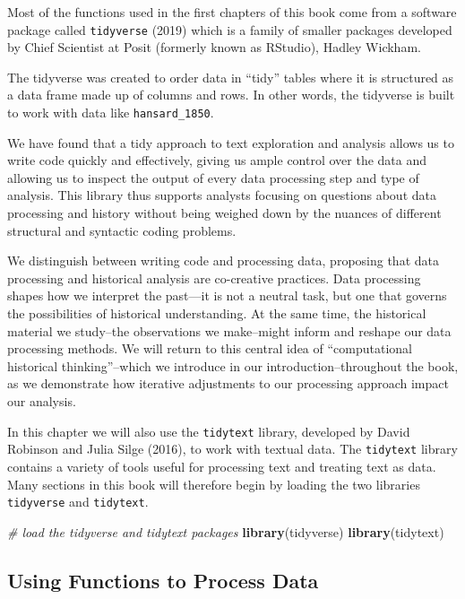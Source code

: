 \documentclass[
]{article}
\newenvironment{Shaded}{\begin{snugshade}}{\end{snugshade}}
\newcommand{\CommentTok}[1]{\textcolor[rgb]{0.56,0.35,0.01}{\textit{#1}}}
\newcommand{\FunctionTok}[1]{\textcolor[rgb]{0.13,0.29,0.53}{\textbf{#1}}}
\newcommand{\NormalTok}[1]{#1}
\begin{document}
Most of the functions used in the first chapters of this book come from
a software package called \texttt{tidyverse} (2019) which is a family of
smaller packages developed by Chief Scientist at Posit (formerly known
as RStudio), Hadley Wickham.

The tidyverse was created to order data in ``tidy'' tables where it is
structured as a data frame made up of columns and rows. In other words,
the tidyverse is built to work with data like \texttt{hansard\_1850}.

We have found that a tidy approach to text exploration and analysis
allows us to write code quickly and effectively, giving us ample control
over the data and allowing us to inspect the output of every data
processing step and type of analysis. This library thus supports
analysts focusing on questions about data processing and history without
being weighed down by the nuances of different structural and syntactic
coding problems.

We distinguish between writing code and processing data, proposing that
data processing and historical analysis are co-creative practices. Data
processing shapes how we interpret the past---it is not a neutral task,
but one that governs the possibilities of historical understanding. At
the same time, the historical material we study--the observations we
make--might inform and reshape our data processing methods. We will
return to this central idea of ``computational historical
thinking''--which we introduce in our introduction--throughout the book,
as we demonstrate how iterative adjustments to our processing approach
impact our analysis.

In this chapter we will also use the \texttt{tidytext} library,
developed by David Robinson and Julia Silge (2016), to work with textual
data. The \texttt{tidytext} library contains a variety of tools useful
for processing text and treating text as data. Many sections in this
book will therefore begin by loading the two libraries
\texttt{tidyverse} and \texttt{tidytext}.

\begin{Shaded}
\begin{Highlighting}[]
\CommentTok{\# load the tidyverse and tidytext packages}
\FunctionTok{library}\NormalTok{(tidyverse)}
\FunctionTok{library}\NormalTok{(tidytext)}
\end{Highlighting}
\end{Shaded}

\subsection{Using Functions to Process
Data}\label{using-functions-to-process-data}
\end{document}
